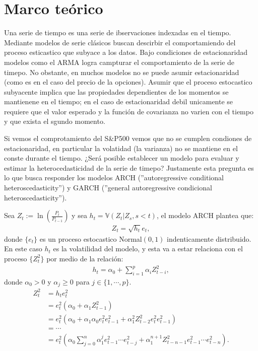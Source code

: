 \section{Marco teórico}
Una serie de tiempo es una serie de ibservaciones indexadas en el tiempo. Mediante modelos de serie clásicos buscan descirbir el comportamiendo del proceso esticastico que subyace a los datos. Bajo condiciones de estacionaridad modelos como el ARMA logra campturar el comportamiento de la serie de timepo. No obstante, en muchos modelos no se puede asumir estacionaridad (como es en el caso del precio de la opciones). Asumir que el proceso estocastico subyacente implica que las propiedades dependientes de los momentos se mantienene en el tiempo; en el caso de estacionaridad debil unicamente se requiere que el valor esperado y la función de covarianza no varien con el tiempo y que exista el sgundo momento.
\newline

Si vemos el comprotamiento del S\&P500 vemos que no se cumplen condiones de estacionaridad, en particular la volatidad (la varianza) no se mantiene en el conste durante el tiempo. ¿Será posible establecer un modelo para evaluar y estimar la heterocedasticidad de la serie de timepo? Justamente esta pregunta es lo que busca responder los modelos ARCH (''autoregressive conditional heteroscedasticity'') y GARCH (''general autoregressive condicional heteroscedasticity''). 
\newline 

Sea $Z_t:= \ln\left(\frac{P_t}{P_{t-1}}\right)$ y sea $h_t= \mathbb{V}\left(Z_t|Z_s,s<t\right)$, el modelo ARCH plantea que: 
\begin{align*}
    Z_t = \sqrt{h_t} e_{t},
\end{align*}
donde $\{e_t\}$ es un proceso estocastico Normal$(0,1)$ indenticamente distribuido. En este caso $h_t$ es la volatilidad del modelo, y esta va a estar relaciona con el proceso $\{Z_t^2\}$ por medio de la relación: 
\begin{align*}
    h_t = \alpha_0 + \sum_{i=1}^{p} \alpha_i Z_{t-i}^2,
\end{align*}
donde $\alpha_0>0$ y $\alpha_j\geq 0$ para $j\in \{1,\cdots,p\}$. 
\begin{align*}
    Z_t^2 &= h_t e_{t}^2\\
    &= e_t^2\left(\alpha_0 + \alpha_1 Z_{t-1}^2\right)\\
    &= e_t^2\left(\alpha_0 +  \alpha_1\alpha_0 e^{2}_{t} e^{2}_{t-1}+ \alpha_1^2 Z_{t-2}^2e^{ 2}_te^{2}_{t-1}\right)\\
    &= \cdots\\
    &= e_t^2\left(\alpha_0 \sum_{j=0}^n \alpha_1^{j}e_{t-1}^2\cdots e_{t-j}^2 +  \alpha_1^{n+1}Z_{t-n-1}^2  e^{2}_{t-1}\cdots e^{2}_{t-n}\right).
\end{align*}

